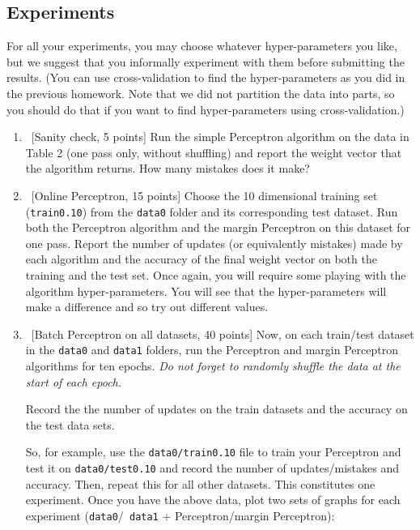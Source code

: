 \subsection*{Experiments}

For all your experiments, you may choose whatever hyper-parameters you
like, but we suggest that you informally experiment with them before
submitting the results. (You can use cross-validation to find the
hyper-parameters as you did in the previous homework. Note that we did
not partition the data into parts, so you should do that if you want
to find hyper-parameters using cross-validation.)

\begin{enumerate}

\item ~[Sanity check, 5 points] Run the simple Perceptron algorithm on
  the data in Table 2 (one pass only, without shuffling) and report
  the weight vector that the algorithm returns. How many mistakes does
  it make?
  
\item ~[Online Perceptron, 15 points] Choose the 10 dimensional
  training set ({\tt train0.10}) from the {\tt data0} folder and its
  corresponding test dataset. Run both the Perceptron algorithm and
  the margin Perceptron on this dataset for one pass. Report the
  number of updates (or equivalently mistakes) made by each algorithm
  and the accuracy of the final weight vector on both the training and
  the test set. Once again, you will require some playing with the
  algorithm hyper-parameters. You will see that the hyper-parameters
  will make a difference and so try out different values.

\item ~[Batch Perceptron on all datasets, 40 points] Now, on each
  train/test dataset in the {\tt data0} and {\tt data1} folders, run
  the Perceptron and margin Perceptron algorithms for ten epochs. {\em
    Do not forget to randomly shuffle the data at the start of each
    epoch.}

  Record the the number of updates on the train datasets and the
  accuracy on the test data sets.

  So, for example, use the {\tt data0/train0.10} file to train your
  Perceptron and test it on {\tt data0/test0.10} and record the number
  of updates/mistakes and accuracy. Then, repeat this for all other
  datasets. This constitutes one experiment. Once you have the above
  data, plot two sets of graphs for each experiment ({\tt data0}/{\tt
    data1} + Perceptron/margin Perceptron):
  \begin{center}
\end{center}
\end{enumerate}
